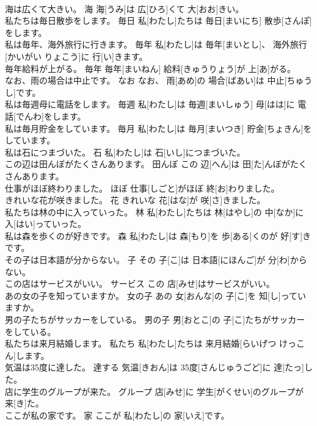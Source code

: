 \documentclass[8pt]{extreport}
\begin{document}
\begin{CJK}{UTF8}{min}
\\	海は広くて大きい。	海	海[うみ]は 広[ひろ]くて 大[おお]きい。	
\\	私たちは毎日散歩をします。	毎日	私[わたし]たちは 毎日[まいにち] 散歩[さんぽ]をします。	
\\	私は毎年、海外旅行に行きます。	毎年	私[わたし]は 毎年[まいとし]、 海外旅行[かいがい りょこう]に 行[い]きます。	
\\	毎年給料が上がる。	毎年	毎年[まいねん] 給料[きゅうりょう]が 上[あ]がる。	
\\	なお、雨の場合は中止です。	なお	なお、 雨[あめ]の 場合[ばあい]は 中止[ちゅうし]です。	
\\	私は毎週母に電話をします。	毎週	私[わたし]は 毎週[まいしゅう] 母[はは]に 電話[でんわ]をします。	
\\	私は毎月貯金をしています。	毎月	私[わたし]は 毎月[まいつき] 貯金[ちょきん]をしています。	
\\	私は石につまづいた。	石	私[わたし]は 石[いし]につまづいた。	
\\	この辺は田んぼがたくさんあります。	田んぼ	この 辺[へん]は 田[た]んぼがたくさんあります。	
\\	仕事がほぼ終わりました。	ほぼ	仕事[しごと]がほぼ 終[お]わりました。	
\\	きれいな花が咲きました。	花	きれいな 花[はな]が 咲[さ]きました。	
\\	私たちは林の中に入っていった。	林	私[わたし]たちは 林[はやし]の 中[なか]に 入[はい]っていった。	
\\	私は森を歩くのが好きです。	森	私[わたし]は 森[もり]を 歩[ある]くのが 好[す]きです。	
\\	その子は日本語が分からない。	子	その 子[こ]は 日本語[にほんご]が 分[わ]からない。	
\\	この店はサービスがいい。	サービス	この 店[みせ]はサービスがいい。	
\\	あの女の子を知っていますか。	女の子	あの 女[おんな]の 子[こ]を 知[し]っていますか。	
\\	男の子たちがサッカーをしている。	男の子	男[おとこ]の 子[こ]たちがサッカーをしている。	
\\	私たちは来月結婚します。	私たち	私[わたし]たちは 来月結婚[らいげつ けっこん]します。	
\\	気温は35度に達した。	達する	気温[きおん]は 35度[さんじゅうごど]に 達[たっ]した。	
\\	店に学生のグループが来た。	グループ	店[みせ]に 学生[がくせい]のグループが 来[き]た。	
\\	ここが私の家です。	家	ここが 私[わたし]の 家[いえ]です。	

\end{CJK}
\end{document}

